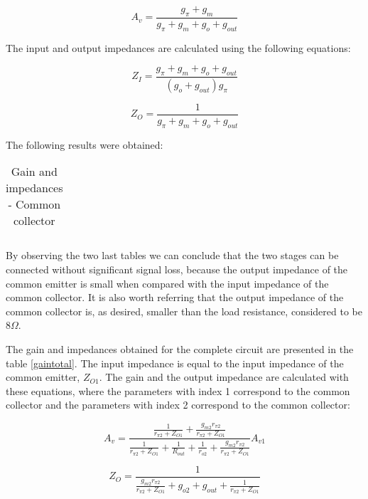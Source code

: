 \begin{equation}
        A_v = \frac{g_{\pi}+g_m}{g_{\pi}+g_m+g_o+g_{out}}
\end{equation}

The input and output impedances are calculated using the following equations:

\begin{equation}
        Z_I = \frac{g_{\pi}+g_m+g_o+g_{out}}{(g_o+g_{out})g_{\pi}}
\end{equation}

\begin{equation}
        Z_O = \frac{1}{g_{\pi}+g_m+g_o+g_{out}}
\end{equation}

The following results were obtained:

\begin{table}[H]
  \centering
  \begin{tabular}{|c|c|}
    \hline
        
        \hline
  \end{tabular}
  \caption{Gain and impedances - Common collector}
  \label{gaincollector}
\end{table}

By observing the two last tables we can conclude that the two stages can be connected without significant signal loss, because the output impedance of the common emitter is small when compared with the input impedance of the common collector. It is also worth referring that the output impedance of the common collector is, as desired, smaller than the load resistance, considered to be $8\Omega$.

The gain and impedances obtained for the complete circuit are presented in the table \ref{gaintotal}. The input impedance is equal to the input impedance of the common emitter, $Z_{O1}$. The gain and the output impedance are calculated with these equations, where the parameters with index 1 correspond to the common collector and the parameters with index 2 correspond to the common collector:

\begin{equation}
        A_v = \frac{\frac{1}{r_{\pi2}+Z_{O1}}+\frac{g_{m2}r_{\pi2}}{r_{\pi2}+Z_{O1}}}{\frac{1}{r_{\pi2}+Z_{O1}}+\frac{1}{R_{out}}+\frac{1}{r_{o2}}+\frac{g_{m2}r_{\pi2}}{r_{\pi2}+Z_{O1}}} A_{v1}
\end{equation}

\begin{equation}
        Z_O = \frac{1}{\frac{g_{m2}r_{\pi2}}{r_{\pi2}+Z_{O1}}+g_{o2}+g_{out}+\frac{1}{r_{\pi2}+Z_{O1}}}
\end{equation}

